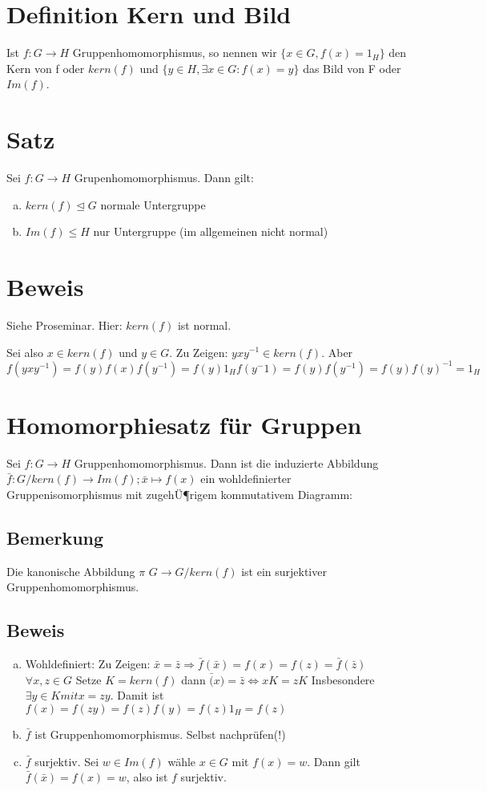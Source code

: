 \documentclass[12pt,a4paper,ngerman]{scrreprt}
\begin{document}
\section{Definition Kern und Bild}
Ist $f: G \to H$ Gruppenhomomorphismus, so nennen wir $\{x \in G, f(x) = 1_H\}$ den Kern von f oder $kern(f)$ und
$\{y \in H, \exists x \in G : f(x) = y\}$ das Bild von F oder $Im(f)$.

\section{Satz}
Sei $f: G \to H$ Grupenhomomorphismus. Dann gilt:
\begin{enumerate}[(a)]
\item $kern(f) \trianglelefteq G$ normale Untergruppe
\item $Im(f) \leq H$ nur Untergruppe (im allgemeinen nicht normal)
\end{enumerate}

\section{Beweis}
Siehe Proseminar. Hier: $kern(f)$ ist normal.

Sei also $x \in kern(f)$ und $y \in G$. Zu Zeigen: $yxy^{-1}\in kern(f)$. Aber $f(yxy^{-1}) = f(y)f(x)f(y^{-1}) = f(y) 1_H f(y^-1) = f(y)f(y^{-1}) = f(y)f(y)^{-1} = 1_H$

\section{Homomorphiesatz für Gruppen}
Sei $f: G \to H$ Gruppenhomomorphismus. Dann ist die induzierte Abbildung $\bar{f}: G/kern(f) \to Im(f); \bar{x} \mapsto f(x)$
ein wohldefinierter Gruppenisomorphismus mit zugehÜ¶rigem kommutativem Diagramm:

\subsection{Bemerkung}
Die kanonische Abbildung $\pi$ $G \to G/kern(f) $ ist ein surjektiver Gruppenhomomorphismus.

\subsection{Beweis}
\begin{enumerate}[(a)]
\item Wohldefiniert: Zu Zeigen: $\bar{x} = \bar{z} \Rightarrow \bar{f}(\bar{x}) = f(x) = f(z) = \bar{f}(\bar{z})$ $\forall x,z \in G$
Setze $ K = kern(f)$ dann $ \bar(x) = \bar{z} \Leftrightarrow  xK = zK $ Insbesondere $ \exists y \in K mit x = zy$. 
Damit ist $f(x) = f(zy) = f(z)f(y) = f(z) 1_H = f(z)$

\item $\bar{f}$ ist Gruppenhomomorphismus. Selbst nachprüfen(!)

\item $\bar{f}$ surjektiv. 
Sei $w \in Im(f)$ wähle $x \in G$ mit $f(x) = w$. 
Dann gilt $\bar{f}(\bar{x}) = f(x) = w$, also ist $f$ surjektiv.

\end{enumerate}
\end{document}
